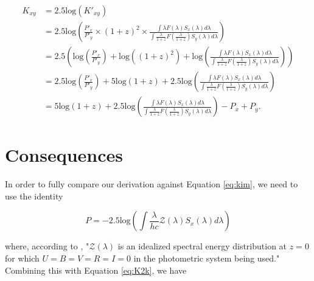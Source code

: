 \documentclass{article}
\begin{document}
\begin{equation}
\begin{aligned}
\label{eq:K2k}
  K_{xy} &= 2.5\text{log}(K'_{xy}) \\
         &= 2.5\text{log}\left(
            \frac{P'_x}{P'_y} \times (1 + z)^2 \times
            \frac{\int \lambda F(\lambda) S_x(\lambda) d\lambda}
                 {\int \frac{\lambda}{1+z} F\left(\frac{\lambda}{1+z}\right) S_y(\lambda) d\lambda}\right) \\
         &= 2.5 \left(
            \text{log} \left( \frac{P'_x}{P'_y} \right)
            + \text{log}( {(1 + z)^2})
            + \text{log}\left( \frac{\int \lambda F(\lambda) S_x(\lambda) d\lambda}
                   {\int \frac{\lambda}{1+z} F\left(\frac{\lambda}{1+z}\right) S_y(\lambda) d\lambda}
            \right) \right) \\
         &= 2.5 \text{log} \left( \frac{P'_x}{P'_y} \right)
            + 5 \text{log} (1 + z)
            + 2.5 \text{log} \left(
              \frac{\int \lambda F(\lambda) S_x(\lambda) d\lambda}
                   {\int \frac{\lambda}{1+z} F\left(\frac{\lambda}{1+z}\right) S_y(\lambda) d\lambda} \right) \\
         &= 5 \text{log} (1 + z)
            + 2.5 \text{log} \left(
              \frac{\int \lambda F(\lambda) S_x(\lambda) d\lambda}
                   {\int \frac{\lambda}{1+z} F\left(\frac{\lambda}{1+z}\right) S_y(\lambda) d\lambda} \right)
            - P_x + P_y .
\end{aligned}
\end{equation}

\section{Consequences}
\label{sec:consequences}

In order to fully compare our derivation against Equation \ref{eq:kim}, we need
to use the identity

\begin{equation}
  P = -2.5 \text{log} \left( \int \frac{\lambda}{hc} \mathcal{Z}(\lambda) S_x(\lambda) d\lambda \right)
\end{equation}

where, according to \citet{kim1996}, "$\mathcal{Z}(\lambda)$ is an idealized
spectral energy distribution at $z = 0$ for which $U = B = V = R = I = 0$ in
the photometric system being used." Combining this with Equation \ref{eq:K2k}, we have
\end{document}

